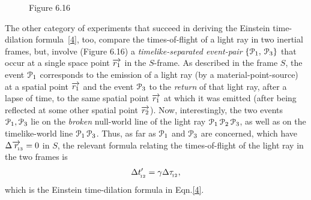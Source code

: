 \begin{figure}[H]
\begin{center}
\end{center}
\caption*{Figure 6.16}\label{fig6.16}
\end{figure}

\newpage
The other category of experiments that {succeed} in  
deriving the Einstein time-dilation  
formula~\eqref{4}, 
too,  compare the times-of-flight of a light ray in 
two 
inertial frames, but, involve (Figure 6.16) a 
\textsl{timelike-separated  event-pair} 
$\{\EuScript{P}_1,\, \EuScript{P}_3\}$ that occur at a 
single space point $\overrightarrow{r_1}$ in the $S$-frame. As 
described in the frame $S$, the event $\EuScript{P}_1$ 
corresponds to the emission of a light ray (by a 
material-point-source) at a spatial point $\overrightarrow{r_1}$ 
and 
the event $\EuScript{P}_3$ to the \textsl{return} of 
that 
light ray, after a lapse of time, to the same spatial 
point 
$\overrightarrow{r_1}$ at which it was emitted (after being 
reflected 
at some other spatial point 
$\overrightarrow{r_2}$). Now,  interestingly, the two events 
$\EuScript{P}_1,\EuScript{P}_3$ lie on the 
\textsl{broken} 
null-world line of the light ray $\EuScript{P}_1\, 
\EuScript{P}_2\, \EuScript{P}_3$, as well as on the  
timelike-world line $\EuScript{P}_1\, \EuScript{P}_3$. 
Thus, as far as $\EuScript{P}_1$ and $\EuScript{P}_3$ 
are 
concerned, which have $\Delta \overrightarrow{r}_{_{\hspace*{-1.5pt}{\negthinspace\negthinspace 13}}} 
=0$ in 
$S$, the relevant formula relating the times-of-flight 
of 
the light ray in the two frames is
\begin{align*} \Delta t'_{_{\hspace*{-1.5pt}{12}}} 
={\gamma} \Delta \tau_{_{\hspace*{-1.5pt}{12}}}, 
\end{align*}                                    
which is the Einstein time-dilation formula in 
Eqn.\eqref{4}.

